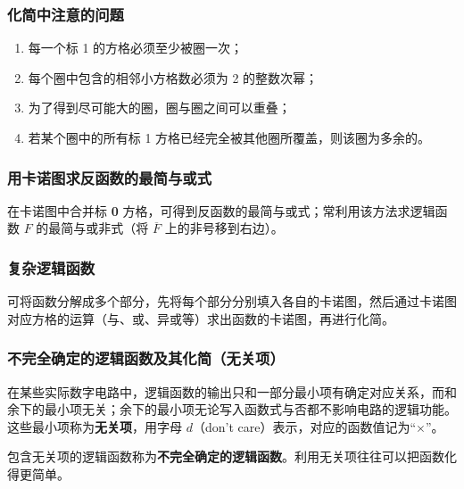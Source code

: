 \subsubsection{化简中注意的问题}
\label{sec:化简中注意的问题}

\begin{enumerate}
	\item 每一个标 1 的方格必须至少被圈一次；
	\item 每个圈中包含的相邻小方格数必须为 2 的整数次幂；
	\item 为了得到尽可能大的圈，圈与圈之间可以重叠；
	\item 若某个圈中的所有标 1 方格已经完全被其他圈所覆盖，则该圈为多余的。
\end{enumerate}

\subsubsection{用卡诺图求反函数的最简与或式}
\label{sec:用卡诺图求反函数的最简与或式}

在卡诺图中合并标 \textbf{0} 方格，可得到反函数的最简与或式；常利用该方法求逻辑函数 $F$ 的最简与或非式（将 $\overline{F}$ 上的非号移到右边）。

\subsubsection{复杂逻辑函数}
\label{sec:复杂逻辑函数}

可将函数分解成多个部分，先将每个部分分别填入各自的卡诺图，然后通过卡诺图对应方格的运算（与、或、异或等）求出函数的卡诺图，再进行化简。

\subsubsection{不完全确定的逻辑函数及其化简（无关项）}
\label{sec:不完全确定的逻辑函数}

\begin{definition}[无关项]
	在某些实际数字电路中，逻辑函数的输出只和一部分最小项有确定对应关系，而和余下的最小项无关；余下的最小项无论写入函数式与否都不影响电路的逻辑功能。这些最小项称为\textbf{无关项}，用字母 $d$（don't care）表示，对应的函数值记为“$\times$”。
\end{definition}

包含无关项的逻辑函数称为\textbf{不完全确定的逻辑函数}。利用无关项往往可以把函数化得更简单。


